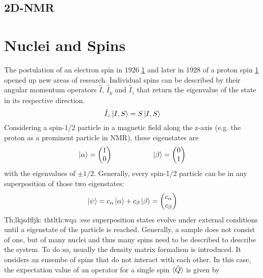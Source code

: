         \subsection{2D-NMR}
        
    \section{Nuclei and Spins}
    The postulation of an electron spin in 1926 \ref{} and later in 1928 of a proton spin \ref{} opened
    up new areas of research.
    Individual spins can be described by their angular momentum operators $\hat{I}$,
    $\hat{I}_y$ and $\hat{I}_z$ that return the eigenvalue of the state in its respective
    direction.
    \begin{equation}
        \hat I_z \ket{I, S} = S \ket{I,S}
    \end{equation}
    Considering a spin-1/2 particle in a magnetic field along the z-axis (e.g. the proton as a prominent particle in NMR), these
    eigenstates are
    \begin{equation}
    \ket\alpha = \begin{pmatrix}1\\0\end{pmatrix} \hspace{2 cm} \ket\beta =
    \begin{pmatrix}0\\1\end{pmatrix}
    \end{equation}
    with the eigenvalues of $\pm 1/2$.
    Generally, every spin-1/2 particle can be in any superposition of those two eigenstates:
    \begin{equation}
        \ket\psi = c_\alpha \ket\alpha + c_\beta \ket \beta = \begin{pmatrix} c_\alpha \\
        c_\beta\end{pmatrix}
    \end{equation}
    Th;lkjsdfljk:
    thtlth:wqa
    :ese superposition states evolve under external conditions until a eigenstate of the particle
    is reached.
    Generally, a sample does not consist of one, but of many nuclei and thus many spins need to be
    described to describe the system. To do so, usually the density matrix formalism is introduced.
    It onsiders an ensembe of spins that do not interact with each other. In this case, the
    expectation value of an operator for a single spin $\braket{\hat Q}$ is given by
